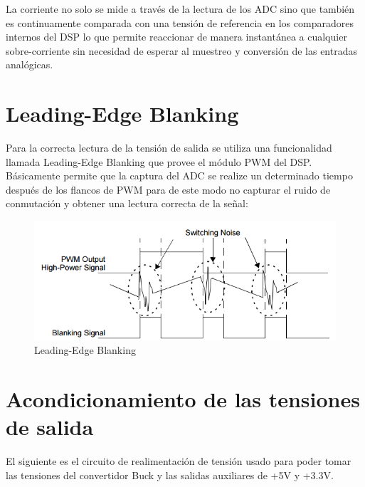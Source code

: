 \documentclass[12pt]{report}
\begin{document}
La corriente no solo se mide a través de la lectura de los ADC sino que también es continuamente comparada con una tensión de referencia en los comparadores internos del DSP lo que permite reaccionar de manera instantánea a cualquier sobre-corriente sin necesidad de esperar al muestreo y conversión de las entradas analógicas.

\section{Leading-Edge Blanking}

Para la correcta lectura de la tensión de salida se utiliza una funcionalidad llamada Leading-Edge Blanking que provee el módulo PWM del DSP. Básicamente permite que la captura del ADC se realize un determinado tiempo después de los flancos de PWM para de este modo no capturar el ruido de conmutación y obtener una lectura correcta de la señal:

\begin{figure}[H]
	\centering
	\includegraphics[width=\textwidth,height=\textheight,keepaspectratio]{leading-edge-blanking}
	\caption{Leading-Edge Blanking}
\end{figure}


\section{Acondicionamiento de las tensiones de salida} \label{acondicionamiento-tensiones}

El siguiente es el circuito de realimentación de tensión usado para poder tomar las tensiones del convertidor Buck y las salidas auxiliares de +5V y +3.3V.
\end{document}
